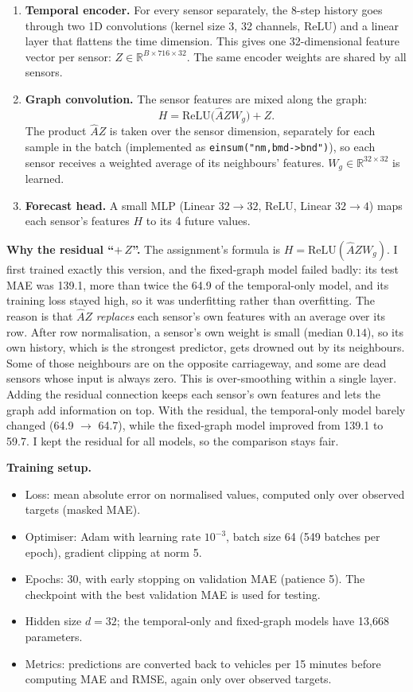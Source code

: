 \documentclass[11pt, a4paper]{article}
\begin{document}
\begin{enumerate}
\item \textbf{Temporal encoder.} For every sensor separately, the 8-step history goes through two 1D convolutions (kernel size 3, 32 channels, ReLU) and a linear layer that flattens the time dimension. This gives one 32-dimensional feature vector per sensor: $Z \in \mathbb{R}^{B \times 716 \times 32}$. The same encoder weights are shared by all sensors.
\item \textbf{Graph convolution.} The sensor features are mixed along the graph:
\[
H = \mathrm{ReLU}\big(\hat{A} Z W_g\big) + Z .
\]
The product $\hat{A}Z$ is taken over the sensor dimension, separately for each sample in the batch (implemented as \texttt{einsum("nm,bmd->bnd")}), so each sensor receives a weighted average of its neighbours' features. $W_g \in \mathbb{R}^{32 \times 32}$ is learned.
\item \textbf{Forecast head.} A small MLP (Linear $32 \to 32$, ReLU, Linear $32 \to 4$) maps each sensor's features $H$ to its 4 future values.
\end{enumerate}

\textbf{Why the residual ``$+\,Z$''.} The assignment's formula is $H = \mathrm{ReLU}(\hat{A} Z W_g)$. I first trained exactly this version, and the fixed-graph model failed badly: its test MAE was 139.1, more than twice the 64.9 of the temporal-only model, and its training loss stayed high, so it was underfitting rather than overfitting. The reason is that $\hat{A}Z$ \emph{replaces} each sensor's own features with an average over its row. After row normalisation, a sensor's own weight is small (median $0.14$), so its own history, which is the strongest predictor, gets drowned out by its neighbours. Some of those neighbours are on the opposite carriageway, and some are dead sensors whose input is always zero. This is over-smoothing within a single layer. Adding the residual connection keeps each sensor's own features and lets the graph add information on top. With the residual, the temporal-only model barely changed (64.9 $\to$ 64.7), while the fixed-graph model improved from 139.1 to 59.7. I kept the residual for all models, so the comparison stays fair.

\textbf{Training setup.}
\begin{itemize}
\item Loss: mean absolute error on normalised values, computed only over observed targets (masked MAE).
\item Optimiser: Adam with learning rate $10^{-3}$, batch size 64 (549 batches per epoch), gradient clipping at norm 5.
\item Epochs: 30, with early stopping on validation MAE (patience 5). The checkpoint with the best validation MAE is used for testing.
\item Hidden size $d = 32$; the temporal-only and fixed-graph models have 13{,}668 parameters.
\item Metrics: predictions are converted back to vehicles per 15 minutes before computing MAE and RMSE, again only over observed targets.
\end{itemize}
\end{document}
